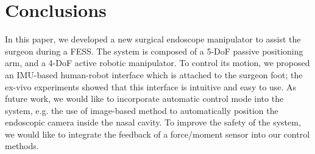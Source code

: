 \documentclass[journal,twoside]{IEEEtran}
\theoremstyle{definition}
\begin{document}
\section{Conclusions}\label{sec:conclusions}

In this paper, we developed a new surgical endoscope
manipulator to assist the surgeon during a FESS. The system
is composed of a 5-DoF passive positioning arm, and a
4-DoF active robotic manipulator. To control its motion,
we proposed an IMU-based human-robot interface which is
attached to the surgeon foot; the ex-vivo experiments showed
that this interface is intuitive and easy to use.
As future work, we would like to incorporate automatic
control mode into the system, e.g. the use of image-based
method to automatically position the endoscopic camera
inside the nasal cavity. To improve the safety of the system,
we would like to integrate the feedback of a force/moment
sensor into our control methods.







\ifCLASSOPTIONcaptionsoff
  \newpage
\fi



\end{document}
